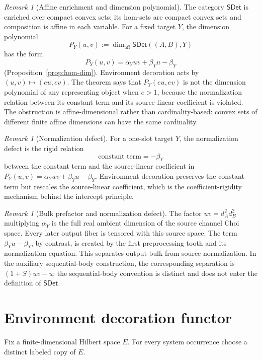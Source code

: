 \documentclass[11pt,a4paper]{article}
\theoremstyle{definition}
\theoremstyle{plain}
\theoremstyle{remark}
\newtheorem{remark}[theorem]{Remark}
\newcommand{\affdim}{\dim_{\mathrm{aff}}}
\newcommand{\SDet}{\mathsf{SDet}}
\begin{document}
\begin{remark}[Affine enrichment and dimension polynomial]
The category $\SDet$ is enriched over compact convex sets: its hom-sets are
compact convex sets and composition is affine in each variable. For a fixed
target $Y$, the dimension polynomial
\[
P_Y(u,v):=\affdim\SDet((A,B),Y)
\]
has the form
\[
P_Y(u,v)=\alpha_Yuv+\beta_Yu-\beta_Y
\]
(Proposition~\ref{prop:hom-dim}).
Environment decoration acts by $(u,v)\mapsto(eu,ev)$. The theorem says
that $P_Y(eu,ev)$ is not the dimension polynomial of any representing
object when $e>1$, because the normalization relation between its constant
term and its source-linear coefficient is violated. The obstruction is
affine-dimensional rather than cardinality-based: convex sets of different
finite affine dimensions can have the same cardinality.
\end{remark}

\begin{remark}[Normalization defect]
For a one-slot target $Y$, the normalization defect is the rigid relation
\[
\text{constant term}=-\beta_Y
\]
between the constant term and the source-linear coefficient in
$P_Y(u,v)=\alpha_Yuv+\beta_Yu-\beta_Y$. Environment decoration preserves
the constant term but rescales the source-linear coefficient, which is
the coefficient-rigidity mechanism behind the intercept principle.
\end{remark}

\begin{remark}[Bulk prefactor and normalization defect]
The factor $uv=d_A^2d_B^2$ multiplying $\alpha_Y$ is the full real
ambient dimension of the source channel Choi space. Every later output
fiber is tensored with this source space. The term
$\beta_Yu-\beta_Y$, by contrast, is created by the first preprocessing
tooth and its normalization equation. This separates output bulk from
source normalization. In the auxiliary sequential-body construction,
the corresponding separation is $(1+S)uv-u$; the sequential-body
convention is distinct and does not enter the definition of $\SDet$.
\end{remark}

\section{Environment decoration functor}

Fix a finite-dimensional Hilbert space $E$. For every system occurrence
choose a distinct labeled copy of $E$.
\end{document}
